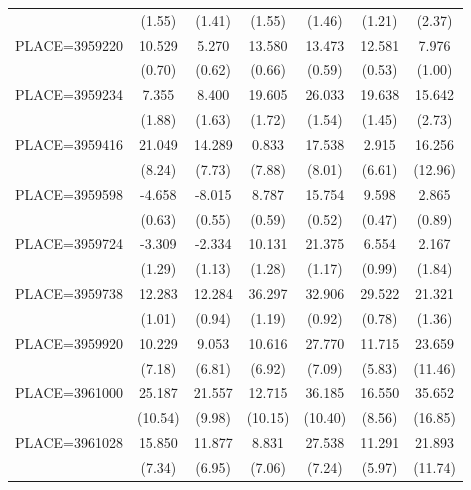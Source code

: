 {\begin{tabular}{l*{6}{c}}
                    &      (1.55)&      (1.41)&      (1.55)&      (1.46)&      (1.21)&      (2.37)\\
PLACE=3959220       &      10.529&       5.270&      13.580&      13.473&      12.581&       7.976\\
                    &      (0.70)&      (0.62)&      (0.66)&      (0.59)&      (0.53)&      (1.00)\\
PLACE=3959234       &       7.355&       8.400&      19.605&      26.033&      19.638&      15.642\\
                    &      (1.88)&      (1.63)&      (1.72)&      (1.54)&      (1.45)&      (2.73)\\
PLACE=3959416       &      21.049&      14.289&       0.833&      17.538&       2.915&      16.256\\
                    &      (8.24)&      (7.73)&      (7.88)&      (8.01)&      (6.61)&     (12.96)\\
PLACE=3959598       &      -4.658&      -8.015&       8.787&      15.754&       9.598&       2.865\\
                    &      (0.63)&      (0.55)&      (0.59)&      (0.52)&      (0.47)&      (0.89)\\
PLACE=3959724       &      -3.309&      -2.334&      10.131&      21.375&       6.554&       2.167\\
                    &      (1.29)&      (1.13)&      (1.28)&      (1.17)&      (0.99)&      (1.84)\\
PLACE=3959738       &      12.283&      12.284&      36.297&      32.906&      29.522&      21.321\\
                    &      (1.01)&      (0.94)&      (1.19)&      (0.92)&      (0.78)&      (1.36)\\
PLACE=3959920       &      10.229&       9.053&      10.616&      27.770&      11.715&      23.659\\
                    &      (7.18)&      (6.81)&      (6.92)&      (7.09)&      (5.83)&     (11.46)\\
PLACE=3961000       &      25.187&      21.557&      12.715&      36.185&      16.550&      35.652\\
                    &     (10.54)&      (9.98)&     (10.15)&     (10.40)&      (8.56)&     (16.85)\\
PLACE=3961028       &      15.850&      11.877&       8.831&      27.538&      11.291&      21.893\\
                    &      (7.34)&      (6.95)&      (7.06)&      (7.24)&      (5.97)&     (11.74)\\

\end{tabular}}
